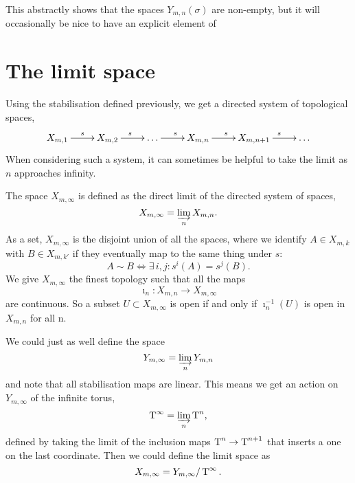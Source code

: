 This abstractly shows that the spaces $Y_{m,n}(\sigma)$ are non-empty,
but it will occasionally be nice to have an explicit element of

\section{The limit space}
\label{sec:rum-gr}

Using the stabilisation defined previously, we get a directed system
of topological spaces,
\[ \xymatrix{X_{m,1} \ar[r]^s & X_{m,2} \ar[r]^s & \dots \ar[r]^s &
  X_{m,n} \ar[r]^s & X_{m,n+1} \ar[r]^s & \dots } \]
When considering such a system, it can sometimes be helpful to
take the limit as $n$ approaches infinity.

\begin{definition}
  The space $X_{m,\infty}$ is defined as the direct limit of the
  directed system of spaces,
  \[ X_{m,\infty} = \varinjlim_n X_{m,n}. \]
  As a set, $X_{m,\infty}$ is the disjoint union of all the spaces,
  where we identify $A \in X_{m,k}$ with $B \in X_{m,k'}$ if they
  eventually map to the same thing under $s$:
  \[ A \sim B \iff \exists\, i,j : s^i(A) = s^j(B). \]
  We give $X_{m,\infty}$ the finest topology such that all the
  maps 
  \[ \imath_n : X_{m,n} \to X_{m,\infty} \]
  are continuous. So a subset $U \subset X_{m,\infty}$ is open if and
  only if $\imath_n^{-1}(U)$ is open in $X_{m,n}$ for all n. 
\end{definition}

We could just as well define the space 
\[ Y_{m,\infty} = \varinjlim_n Y_{m,n} \]
and note that all stabilisation maps are linear. This means we get an
action on $Y_{m,\infty}$ of the infinite torus,
\[ \operatorname{T}^\infty = \varinjlim_n \operatorname{T}^n, \]
defined by taking the
limit of the
inclusion maps $\operatorname{T}^n \to \operatorname{T}^{n+1}$ that inserts a one on the last
coordinate.
Then we could define the limit space as
\[ X_{m,\infty} = Y_{m,\infty}/\operatorname{T}^\infty. \]




